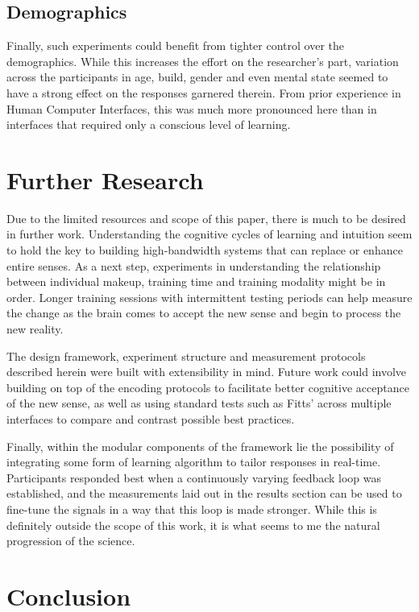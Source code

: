 \documentclass[
12pt, %
oneside, %
english, %
doublespacing, %
headsepline, %
]{MastersDoctoralThesis} %
\begin{document}
\subsection{Demographics}

Finally, such experiments could benefit from tighter control over the demographics. While this increases the effort on the researcher's part, variation across the participants in age, build, gender and even mental state seemed to have a strong effect on the responses garnered therein. From prior experience in Human Computer Interfaces, this was much more pronounced here than in interfaces that required only a conscious level of learning.

\section{Further Research}

Due to the limited resources and scope of this paper, there is much to be desired in further work. Understanding the cognitive cycles of learning and intuition seem to hold the key to building high-bandwidth systems that can replace or enhance entire senses. As a next step, experiments in understanding the relationship between individual makeup, training time and training modality might be in order. Longer training sessions with intermittent testing periods can help measure the change as the brain comes to accept the new sense and begin to process the new reality.

The design framework, experiment structure and measurement protocols described herein were built with extensibility in mind. Future work could involve building on top of the encoding protocols to facilitate better cognitive acceptance of the new sense, as well as using standard tests such as Fitts' across multiple interfaces to compare and contrast possible best practices.

Finally, within the modular components of the framework lie the possibility of integrating some form of learning algorithm to tailor responses in real-time. Participants responded best when a continuously varying feedback loop was established, and the measurements laid out in the results section can be used to fine-tune the signals in a way that this loop is made stronger. While this is definitely outside the scope of this work, it is what seems to me the natural progression of the science.

\section{Conclusion}
\end{document}
